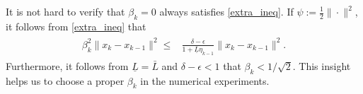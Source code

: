 \documentclass[letterpaper]{article} %
\begin{document}
	It is not hard to verify that $\beta_k=0$ always satisfies \eqref{extra_ineq}.
	If $\psi:=\frac{1}{2}\|\cdot\|^{2}$, it follows from \eqref{extra_ineq} that
	\begin{eqnarray}
		\begin{aligned}
			\beta_{k}^{2}\|x_{k}-x_{k-1}\|^{2}\le& \frac{\delta-\epsilon}{1+\underline{L}\eta_{k-1}}\|x_{k}-x_{k-1}\|^{2}. \end{aligned}\label{example_beta}
	\end{eqnarray}
	Furthermore, it follows from  $\underline{L}=\bar{L}$ and $\delta-\epsilon<1$ that $\beta_{k}< 1/\sqrt{2}$.
	This insight helps us to choose a proper $\beta_k$ in the numerical experiments.
\end{document}
